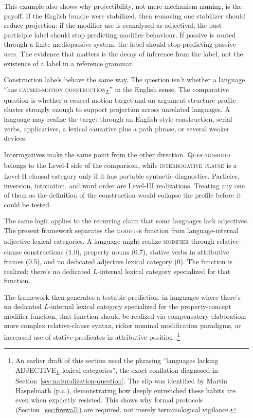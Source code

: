 \documentclass[12pt]{article}
\begin{document}
This example also shows why projectibility, not mere mechanism naming, is the payoff. If the English bundle were stabilized, then removing one stabilizer should reduce projection: if the modifier use is reanalysed as adjectival, the past-participle label should stop predicting modifier behaviour. If passive is routed through a finite mediopassive system, the label should stop predicting passive uses. The evidence that matters is the decay of inference from the label, not the existence of a label in a reference grammar.

Construction labels behave the same way. The question isn't whether a language \enquote{has \textsc{caused-motion construction}\textsubscript{$L$}} in the English sense. The comparative question is whether a caused-motion target and an argument-structure profile cluster strongly enough to support projection across unrelated languages. A language may realize the target through an English-style construction, serial verbs, applicatives, a lexical causative plus a path phrase, or several weaker devices.

Interrogatives make the same point from the other direction. \textsc{Questionhood}\textsubscript{\Cross} belongs to the Level-I side of the comparison, while \textsc{interrogative clause}\textsubscript{\Cross} is a Level-II clausal category only if it has portable syntactic diagnostics. Particles, inversion, intonation, and word order are Level-III realizations. Treating any one of them as the definition of the construction would collapse the profile before it could be tested.

The same logic applies to the recurring claim that some languages lack adjectives. The present framework separates the \textsc{modifier}\textsubscript{\Cross} function from language-internal adjective lexical categories. A language might realize \textsc{modifier}\textsubscript{\Cross} through relative-clause constructions (1.0), property nouns (0.7), stative verbs in attributive frames (0.5), and no dedicated adjective lexical category (0). The function is realized; there's no dedicated $L$-internal lexical category specialized for that function.

The framework then generates a testable prediction: in languages where there's no dedicated $L$-internal lexical category specialized for the property-concept modifier function, that function should be realized via compensatory elaboration: more complex relative-clause syntax, richer nominal modification paradigms, or increased use of stative predicates in attributive position \parencite{dixon2004,croft2001}.\footnote{An earlier draft of this section used the phrasing \enquote{languages lacking ADJECTIVE\textsubscript{$L$} lexical categories}, the exact conflation diagnosed in Section~\ref{sec:naturalization-question}. The slip was identified by Martin Haspelmath (p.c.), demonstrating how deeply entrenched these habits are even when explicitly resisted. This shows why formal protocols (Section~\ref{sec:firewall}) are required, not merely terminological vigilance.}
\end{document}
